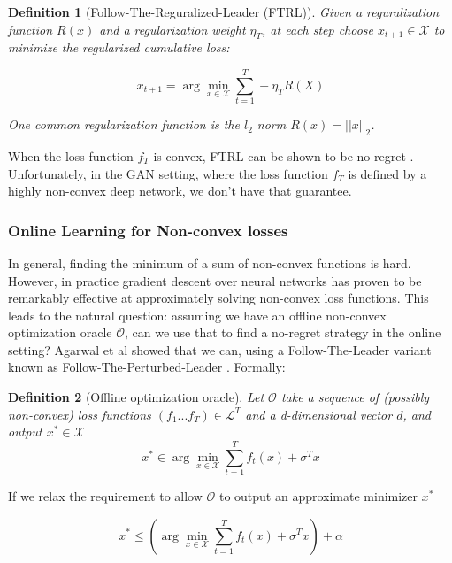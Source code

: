 \documentclass[]{article}
\newcommand{\X}{\mathcal{X}}
\newtheorem{definition}{Definition}
\begin{document}
\begin{definition}[Follow-The-Reguralized-Leader (FTRL)]
    Given a reguralization function $R(x)$ and a regularization weight $\eta_T$, at each step choose $x_{t+1} \in \X$ to minimize the regularized cumulative loss:

    \begin{equation}
        x_{t+1} = \arg\min_{x \in \X} \sum_{t=1}^T + \eta_T R(X)
    \end{equation}

    One common regularization function is the $l_2$ norm $R(x) = ||x||_2$.  
\end{definition}

When the loss function $f_T$ is convex, FTRL can be shown to be no-regret \cite{Haz19}. Unfortunately, in the GAN setting, where the loss function $f_T$ is defined by a highly non-convex deep network, we don't have that guarantee. 

\subsubsection{Online Learning for Non-convex losses}
In general, finding the minimum of a sum of non-convex functions is hard. However, in practice gradient descent over neural networks has proven to be remarkably effective at approximately solving non-convex loss functions. This leads to the natural question: assuming we have an offline non-convex optimization oracle $\mathcal{O}$, can we use that to find a no-regret strategy in the online setting? Agarwal et al showed that we can, using a Follow-The-Leader variant known as Follow-The-Perturbed-Leader \cite{AGH18}. Formally:

\begin{definition}[Offline optimization oracle]
    Let $\mathcal{O}$ take a sequence of (possibly non-convex) loss functions $(f_1...f_T) \in \mathcal{L}^T$ and a d-dimensional vector $d$, and output $x^* \in \X$
    \begin{equation}
        x^* \in \arg\min_{x \in \X} \sum_{t=1}^Tf_t(x) + \sigma^Tx
    \end{equation}
\end{definition}

If we relax the requirement to allow $\mathcal{O}$ to output an approximate minimizer $x^*$

\begin{equation}
    x^* \leq \left(\arg\min_{x \in \X} \sum_{t=1}^Tf_t(x) + \sigma^Tx\right) + \alpha
\end{equation}
\end{document}
